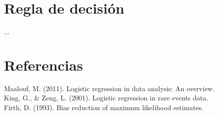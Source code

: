 \documentclass[12pt]{report}
\begin{document}
\chapter{Regla de decisi\'on}
...

\chapter*{Referencias}
Maalouf, M. (2011). Logistic regression in data analysis: An overview. \\ 
King, G., \& Zeng, L. (2001). Logistic regression in rare events data. \\ 
Firth, D. (1993). Bias reduction of maximum likelihood estimates.
\end{document}
